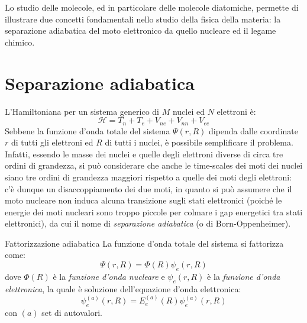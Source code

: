 
Lo studio delle molecole, ed in particolare delle molecole diatomiche, permette di illustrare due concetti fondamentali nello studio della fisica della materia: la separazione adiabatica del moto elettronico da quello nucleare ed il legame chimico.

\section{Separazione adiabatica}

L'Hamiltoniana per un sistema generico di $ M $ nuclei ed $ N $ elettroni è:
\begin{equation}
	\mathcal{H} = T_n + T_e + V_{ne} + V_{nn} + V_{ee}
	\label{eq:mol-ham-tot}
\end{equation}
Sebbene la funzione d'onda totale del sistema $ \Psi(r,R) $ dipenda dalle coordinate $ r $ di tutti gli elettroni ed $ R $ di tutti i nuclei, è possibile semplificare il problema. Infatti, essendo le masse dei nuclei e quelle degli elettroni diverse di circa tre ordini di grandezza, si può considerare che anche le time-scales dei moti dei nuclei siano tre ordini di grandezza maggiori rispetto a quelle dei moti degli elettroni: c'è dunque un disaccoppiamento dei due moti\footnotemark, in quanto si può assumere che il moto nucleare non induca alcuna transizione sugli stati elettronici (poiché le energie dei moti nucleari sono troppo piccole per colmare i gap energetici tra stati elettronici), da cui il nome di \textit{separazione adiabatica} (o di Born-Oppenheimer).


\begin{definition}{Fattorizzazione adiabatica}{}
	La funzione d'onda totale del sistema si fattorizza come:
	\begin{equation}
		\Psi(r,R) = \Phi(R) \psi_e(r,R)
	\end{equation}
	dove $ \Phi(R) $ è la \textit{funzione d'onda nucleare} e $ \psi_e(r,R) $ è la \textit{funzione d'onda elettronica}, la quale è soluzione dell'equazione d'onda elettronica:
	\begin{equation}
		[T_e + V_{ne}(r,R) + V_{ee}(r)] \psi_e^{(a)}(r,R) = E_e^{(a)}(R) \psi_e^{(a)}(r,R)
		\label{eq:mol-el-eq}
	\end{equation}
	con $ (a) $ set di autovalori.
\end{definition}


